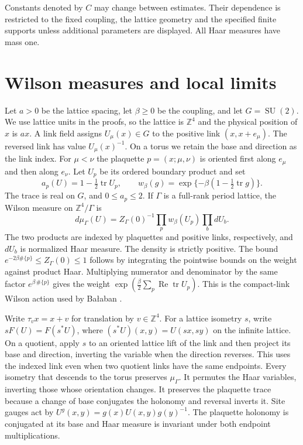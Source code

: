\documentclass[11pt,letterpaper,reqno]{amsart}
\numberwithin{equation}{section}
\theoremstyle{definition}
\theoremstyle{remark}
\begin{document}
Constants denoted by \(C\) may change between estimates. Their
dependence is restricted to the fixed coupling, the lattice
geometry and the specified finite supports unless additional
parameters are displayed. All Haar measures have mass one.


\section{Wilson measures and local limits}\label{sec:lp-measures}

Let \(a>0\) be the lattice spacing, let \(\beta\ge0\) be the
coupling, and let \(G=\operatorname{SU}(2)\).
We use lattice units in the proofs, so the lattice is \(\mathbb Z^4\)
and the physical position of \(x\) is \(ax\).
A link field assigns \(U_\mu(x)\in G\) to the positive link
\((x,x+e_\mu)\). The reversed link has value \(U_\mu(x)^{-1}\).
On a torus we retain the base and direction as the link index.
For \(\mu<\nu\) the plaquette \(p=(x;\mu,\nu)\) is oriented first
along \(e_\mu\) and then along \(e_\nu\). Let \(U_p\) be its ordered
boundary product and set
\[
 a_p(U)=1-\tfrac12\operatorname{tr}U_p,\qquad
 w_\beta(g)=\exp\{-\beta(1-\tfrac12\operatorname{tr}g)\}.
\]
The trace is real on \(G\), and \(0\le a_p\le2\).
If \(\Gamma\) is a full-rank period lattice, the Wilson measure on
\(\mathbb Z^4/\Gamma\) is
\begin{equation}\label{eq:lp-wilson}
 d\mu_\Gamma(U)=Z_\Gamma(0)^{-1}\prod_p w_\beta(U_p)\prod_b dU_b .
\end{equation}
The two products are indexed by plaquettes and positive links,
respectively, and \(dU_b\) is normalized Haar measure. The density is strictly positive. The
bound \(e^{-2\beta\#\{p\}}\le Z_\Gamma(0)\le1\) follows by integrating
the pointwise bounds on the weight against product Haar.
Multiplying numerator and denominator by the same factor
\(e^{\beta\,\#\{p\}}\) gives the weight
\(\exp(\frac\beta2\sum_p\operatorname{Re}\operatorname{tr}U_p)\).
This is the compact-link Wilson action used by Ba{\l}aban
\cite[pp.~251--252, (0.2)]{Bal87}.

Write \(\tau_v x=x+v\) for translation by \(v\in\mathbb Z^4\).
For a lattice isometry \(s\), write \(sF(U)=F(s^*U)\), where
\((s^*U)(x,y)=U(sx,sy)\) on the infinite lattice.
On a quotient, apply \(s\) to an oriented lattice lift of the link
and then project its base and direction, inverting the variable
when the direction reverses. This uses the indexed link even when
two quotient links have the same endpoints.
Every isometry that descends to the torus preserves \(\mu_\Gamma\).
It permutes the Haar variables, inverting those whose orientation
changes. It preserves the plaquette trace because a change of base
conjugates the holonomy and reversal inverts it.
Site gauges act by \(U^g(x,y)=g(x)U(x,y)g(y)^{-1}\).
The plaquette holonomy is conjugated at its base and Haar measure is
invariant under both endpoint multiplications.
\end{document}
